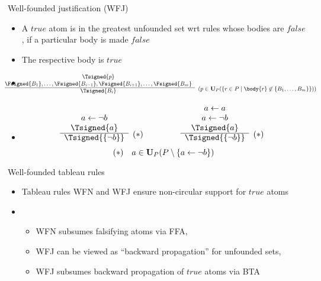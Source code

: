 \begin{frame}{Well-founded justification (WFJ)}
\begin{itemize}
\item {} A $\mathit{true}$ atom is in the greatest unfounded set wrt rules whose bodies are $\mathit{false}$,
  if a particular body is made $\mathit{false}$
\item {} The respective body is $\mathit{true}$
\item {} %
\[
\hspace{-10mm}
{\small
\begin{array}{@{}cl}
\Tsigned{p} \\
\Fsigned{B_1},\dots,\Fsigned{B_{i-1}},\Fsigned{B_{i+1}},\dots,\Fsigned{B_m} &
\raisebox{-8pt}[0pt][0pt]{($p \in \mathbf{U}_P(\{r \in P \mid \body{r} \not\in \{B_1,\dots,B_m\}\})$)}
\\\cline{1-1}
\Tsigned{B_i}
\end{array}
}
\]
\item<2->  %
\[
\begin{array}[b]{cl}
a \leftarrow \neg b \\
\Tsigned{a} &
\raisebox{-8pt}[0pt][0pt]{$(*)$}
\\\cline{1-1}
\Tsigned{\{\neg b\}}
\end{array}
\qquad\qquad
\begin{array}[b]{cl}
a \leftarrow a \\
a \leftarrow \neg b \\
\Tsigned{a} &
\raisebox{-8pt}[0pt][0pt]{$(*)$}
\\\cline{1-1}
\Tsigned{\{\neg b\}}
\end{array}
\hfill
\]
\[
\hfill
(*)\quad a \in \mathbf{U}_P(P \setminus \{a \leftarrow \neg b\})
\hfill\hfill
\]
\end{itemize}
\end{frame}
\begin{frame}{Well-founded tableau rules}
  \bigskip
  \begin{itemize}
  \item<1-> Tableau rules WFN and WFJ ensure non-circular support for $\mathit{true}$ atoms
  \item<2-> 
    \begin{itemize}\normalsize
    \item WFN subsumes falsifying atoms via FFA,
    \item WFJ can be viewed as ``backward propagation'' for unfounded sets,
    \item WFJ subsumes backward propagation of $\mathit{true}$ atoms via BTA
    \end{itemize}
  \end{itemize}
\end{frame}
